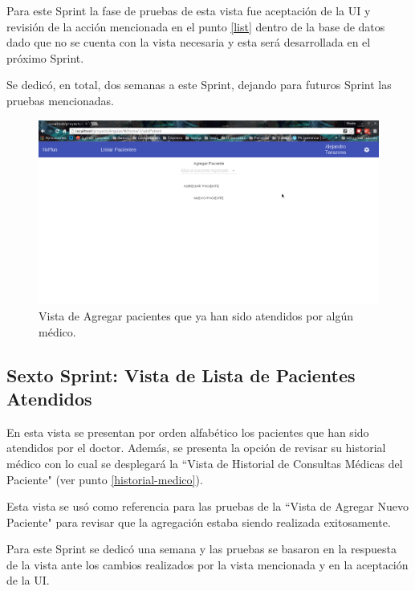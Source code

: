      Para este Sprint la fase de pruebas de esta vista fue aceptación de la UI y revisión de la acción mencionada en el punto \ref{list} dentro de la base de datos dado que no se cuenta con la vista necesaria y esta será desarrollada en el próximo Sprint.
    
    Se dedicó, en total, dos semanas a este Sprint, dejando para futuros Sprint las pruebas mencionadas.
    
    \begin{figure}[htbp!]
        \begin{center}
            \includegraphics[width=.8\textwidth]{figures/p8}
        \end{center}
        \caption{Vista de Agregar pacientes que ya han sido atendidos por algún médico.}
        \label{Agregar}
    \end{figure}
    
    \subsection{Sexto Sprint: Vista de Lista de Pacientes Atendidos}
    
    En esta vista se presentan por orden alfabético los pacientes que han sido atendidos por el doctor. Además, se presenta la opción de revisar su historial médico con lo cual se desplegará la ``Vista de Historial de Consultas Médicas del Paciente" (ver punto \ref{historial-medico}).
    
    Esta vista se usó como referencia para las pruebas de la ``Vista de Agregar Nuevo Paciente" para revisar que la agregación estaba siendo realizada exitosamente.
    
    Para este Sprint se dedicó una semana y las pruebas se basaron en la respuesta de la vista ante los cambios realizados por la vista mencionada y en la aceptación de la UI.
    
